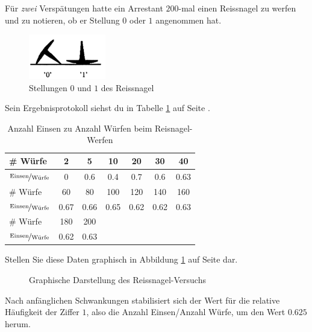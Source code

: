 \documentclass[%
11pt,%
twoside,%
titlepage,%
german,%
headsepline%
]{scrartcl}
\newcommand{\spaltenheight}{\rule{0mm}{3ex}}
\newcommand{\spaltensep}{\\[1ex]}
\begin{document}
Für \emph{zwei} Verspätungen hatte ein Arrestant $200$-mal einen Reissnagel zu werfen und zu notieren, ob er Stellung $0$ oder $1$ angenommen hat.
\begin{figure}
\centering
\includegraphics[width=0.3\textwidth]{pictures/reisnagel}
\caption{Stellungen $0$ und $1$ des Reissnagel}
\end{figure}
Sein Ergebnisprotokoll siehst du in Tabelle \ref{tab:arrest} auf Seite \pageref{tab:arrest}.
\begin{table}
\centering
\begin{tabular}{|l|c|c|c|c|c|c|} \hline
\rowcolor{Gray}\spaltenheight\# Würfe & 2 & 5 & 10 & 20 & 30 & 40\spaltensep \hline
\rowcolor{lightyellow}\spaltenheight$\nicefrac{\text{Einsen}}{\text{Würfe}}$ & 0 & 0.6 & 0.4 & 0.7 & 0.6 & 0.63\spaltensep \hline
\rowcolor{Gray}\spaltenheight\# Würfe & 60 & 80 & 100 & 120 & 140 & 160\spaltensep \hline
\rowcolor{lightyellow}\spaltenheight$\nicefrac{\text{Einsen}}{\text{Würfe}}$ & 0.67& 0.66 & 0.65 & 0.62 & 0.62 & 0.63\spaltensep \hline
\rowcolor{Gray}\spaltenheight\# Würfe & 180 & 200 & & & &\spaltensep \hline
\rowcolor{lightyellow}\spaltenheight$\nicefrac{\text{Einsen}}{\text{Würfe}}$ & 0.62 & 0.63 & & & &\spaltensep \hline
\end{tabular}
\caption{Anzahl Einsen zu Anzahl Würfen beim Reisnagel-Werfen}\label{tab:arrest}
\end{table}

Stellen Sie diese Daten graphisch in Abbildung \ref{graph} auf Seite \pageref{graph} dar.

\begin{figure}
\centering
{}
\caption{Graphische Darstellung des Reiss\-nagel-\-Versuchs}\label{graph}
\end{figure}
Nach anfänglichen Schwankungen stabilisiert sich der Wert für die relative Häufigkeit der Ziffer $1$, also die Anzahl Einsen/Anzahl Würfe, um den Wert $0.625$ herum.
\end{document}
